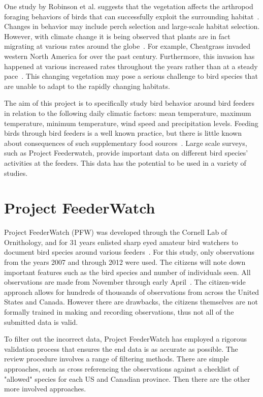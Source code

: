 One study by Robinson et al. suggests that the vegetation affects the arthropod foraging behaviors of birds that can successfully exploit the surrounding habitat~\cite{robinson1982foraging}. Changes in behavior may include perch selection and large-scale habitat selection. However, with climate change it is being observed that plants are in fact migrating at various rates around the globe~\cite{pitelka1997plant}. For example, Cheatgrass invaded western North America for over the past century. Furthermore, this invasion has happened at various increased rates throughout the years rather than at a steady pace~\cite{pitelka1997plant}. This changing vegetation may pose a serious challenge to bird species that are unable to adapt to the rapidly changing habitats.

The aim of this project is to specifically study bird behavior around bird feeders in relation to the following daily climatic factors: mean temperature, maximum temperature, minimum temperature, wind speed and precipitation levels. Feeding birds through bird feeders is a well known practice, but there is little known about consequences of such supplementary food sources~\cite{jones2008feeding}. Large scale surveys, such as Project Feederwatch, provide important data on different bird species' activities at the feeders. This data has the potential to be used in a variety of studies.


\section{Project FeederWatch}

Project FeederWatch (PFW) was developed through the Cornell Lab of Ornithology, and for 31 years enlisted sharp eyed amateur bird watchers to document bird species around various feeders~\cite{louv2012citizen}. For this study, only observations from the years 2007 and through 2012 were used. The citizens will note down important features such as the bird species and number of individuals seen. All observations are made from November through early April~\cite{ProjectO75:online}. The citizen-wide approach allows for hundreds of thousands of observations from across the United States and Canada. However there are drawbacks, the citizens themselves are not formally trained in making and recording observations, thus not all of the submitted data is valid.

To filter out the incorrect data, Project FeederWatch has employed a rigorous validation process that ensures the end data is as accurate as possible. The review procedure involves a range of filtering methods. There are simple approaches, such as cross referencing the observations against a checklist of "allowed" species for each US and Canadian province. Then there are the other more involved approaches. 

